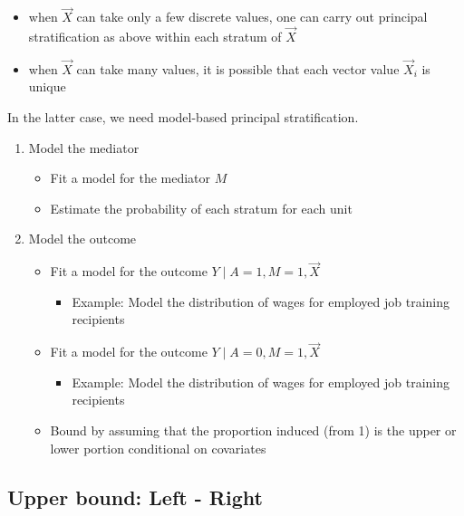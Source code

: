 \documentclass[
]{book}
\providecommand{\tightlist}{%
  \setlength{\itemsep}{0pt}\setlength{\parskip}{0pt}}
\begin{document}
\begin{itemize}
\tightlist
\item
  when \(\vec{X}\) can take only a few discrete values, one can carry out principal stratification as above within each stratum of \(\vec{X}\)
\item
  when \(\vec{X}\) can take many values, it is possible that each vector value \(\vec{X}_i\) is unique
\end{itemize}

In the latter case, we need model-based principal stratification.

\begin{enumerate}
\def\labelenumi{\arabic{enumi})}
\tightlist
\item
  Model the mediator

  \begin{itemize}
  \tightlist
  \item
    Fit a model for the mediator \(M\)
  \item
    Estimate the probability of each stratum for each unit
  \end{itemize}
\item
  Model the outcome

  \begin{itemize}
  \tightlist
  \item
    Fit a model for the outcome \(Y\mid A = 1, M = 1, \vec{X}\)

    \begin{itemize}
    \tightlist
    \item
      Example: Model the distribution of wages for employed job training recipients
    \end{itemize}
  \item
    Fit a model for the outcome \(Y\mid A = 0, M = 1, \vec{X}\)

    \begin{itemize}
    \tightlist
    \item
      Example: Model the distribution of wages for employed job training recipients
    \end{itemize}
  \item
    Bound by assuming that the proportion induced (from 1) is the upper or lower portion conditional on covariates
  \end{itemize}
\end{enumerate}

\hypertarget{upper-bound-left---right}{%
\subsection{Upper bound: Left - Right}\label{upper-bound-left---right}}
\end{document}
